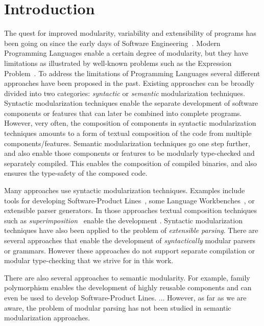 \section{Introduction}\label{sec:introduction}
 
The quest for improved modularity, variability and extensibility of
programs has been going on since the early days of Software
Engineering~\cite{}. Modern Programming Languages enable a certain
degree of modularity, but they have limitations as illustrated by
well-known problems such as the Expression Problem~\cite{}. To address
the limitations of Programming Languages several different approaches
have been proposed in the past. Existing approaches can be broadly
divided into two categories: \emph{syntactic} or \emph{semantic} 
modularization techniques. Syntactic modularization techniques enable 
the separate development of software components or features that can
later be combined into complete programs. However, very often, the 
composition of components in syntactic modularization techniques 
amounts to a form of textual composition of the code from multiple 
components/features. Semantic modularization
techniques go one step further, and also enable those components or
features to be modularly type-checked and separately compiled. This
enables the composition of compiled binaries, and also ensures the
type-safety of the composed code.  

Many approaches use syntactic modularization techniques. Examples
include tools for developing Software-Product Lines~\cite{}, some
Language Workbenches~\cite{}, or extensible parser generators.  In
those approaches textual composition techniques such as
\emph{superimposition}~\cite{} enable the development . Syntactic
modularization techniques have also been applied to the problem of
\emph{extensible parsing}. There are several approaches that enable
the development of \emph{syntactically} modular parsers or
grammars. However these approaches do not support separate compilation
or modular type-checking that we strive for in this work.

\begin{comment}
 such as AHEAD or 
FeatureHouse, which enable the development of highly reusable 
software components that can be combined to form complete 
software products.
\end{comment}  

There are also several approaches to semantic modularity. For example,
family polymorphism enables the development of highly reusable
components and can even be used to develop Software-Product Lines. 
... However, as far as we are aware, the problem of modular parsing 
has not been studied in semantic modularization
approaches.

